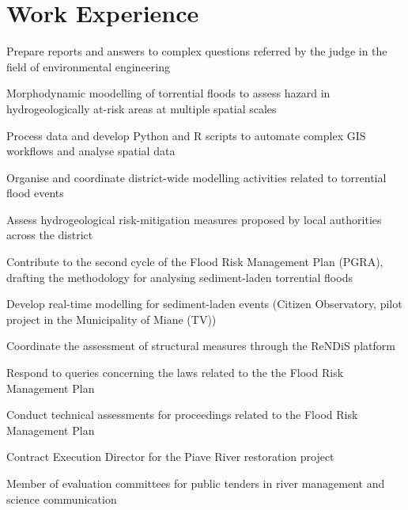 
\section{Work Experience}

\begin{tightemize}
\item Prepare reports and answers to complex questions referred by the judge in the field of environmental engineering
\end{tightemize}
\sectionsep

\begin{tightemize}
\item Morphodynamic moodelling of torrential floods to assess hazard in hydrogeologically at-risk areas at multiple spatial scales
\item Process data and develop Python and R scripts to automate complex GIS workflows and analyse spatial data
\item Organise and coordinate district-wide modelling activities related to torrential flood events
\item Assess hydrogeological risk-mitigation measures proposed by local authorities across the district
\item Contribute to the second cycle of the Flood Risk Management Plan (PGRA), drafting the methodology for analysing sediment-laden torrential floods
\item Develop real-time modelling for sediment-laden events (Citizen Observatory, pilot project in the Municipality of Miane (TV))
\item Coordinate the assessment of structural measures through the ReNDiS platform
\item Respond to queries concerning the laws related to the the Flood Risk Management Plan
\item Conduct technical assessments for proceedings related to the Flood Risk Management Plan
\item Contract Execution Director for the Piave River restoration project
\item Member of evaluation committees for public tenders in river management and science communication
\end{tightemize}
\sectionsep

